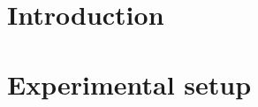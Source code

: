 \documentclass[final,5p,12pt,twocolumn]{elsaarticle}
\begin{document}
\maketitle
\clearpage

\section{Introduction}\label{introduction}


\section{Experimental setup}\label{setup}




\end{document}
